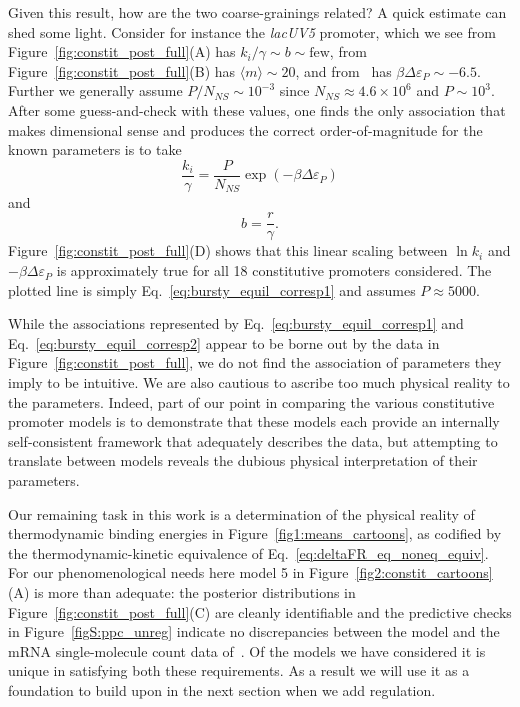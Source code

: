 Given this result, how are the two coarse-grainings related? A quick estimate
can shed some light. Consider for instance the \textit{lacUV5} promoter, which
we see from Figure~\ref{fig:constit_post_full}(A) has $k_i/\gamma \sim b \sim
\text{few}$, from Figure~\ref{fig:constit_post_full}(B) has $\langle m \rangle
\sim 20$, and from~\cite{Brewster2012} has $\beta\Delta\varepsilon_P \sim -
6.5$. Further we generally assume $P/N_{NS} \sim 10^{-3}$ since
$N_{NS}\approx4.6\times10^6$ and $P\sim10^3$. After some guess-and-check with
these values, one finds the only association that makes dimensional sense and
produces the correct order-of-magnitude for the known parameters is to take
\begin{equation}
\frac{k_i}{\gamma} = \frac{P}{N_{NS}} \exp(-\beta\Delta\varepsilon_P)
\label{eq:bursty_equil_corresp1}
\end{equation}
and
\begin{equation}
b = \frac{r}{\gamma}.
\label{eq:bursty_equil_corresp2}
\end{equation}
Figure~\ref{fig:constit_post_full}(D) shows that this linear scaling between
$\ln k_i$ and $-\beta\Delta\varepsilon_P$ is approximately true for all 18
constitutive promoters considered. The plotted line is simply
Eq.~\ref{eq:bursty_equil_corresp1} and assumes $P\approx 5000$.

While the associations represented by Eq.~\ref{eq:bursty_equil_corresp1} and
Eq.~\ref{eq:bursty_equil_corresp2} appear to be borne out by the data in
Figure~\ref{fig:constit_post_full}, we do not find the association of parameters
they imply to be intuitive. We are also cautious to ascribe too much physical
reality to the parameters. Indeed, part of our point in comparing the various
constitutive promoter models is to demonstrate that these models each provide an
internally self-consistent framework that adequately describes the data, but
attempting to translate between models reveals the dubious physical
interpretation of their parameters.

Our remaining task in this work is a determination of the physical reality of
thermodynamic binding energies in Figure~\ref{fig1:means_cartoons}, as codified
by the thermodynamic-kinetic equivalence of Eq.~\ref{eq:deltaFR_eq_noneq_equiv}.
For our phenomenological needs here model 5 in
Figure~\ref{fig2:constit_cartoons}(A) is more than adequate: the posterior
distributions in Figure~\ref{fig:constit_post_full}(C) are cleanly identifiable
and the predictive checks in Figure~\ref{figS:ppc_unreg} indicate no
discrepancies between the model and the mRNA single-molecule count data
of~\cite{Jones2014}. Of the models we have considered it is unique in satisfying
both these requirements. As a result we will use it as a foundation to build
upon in the next section when we add regulation.

